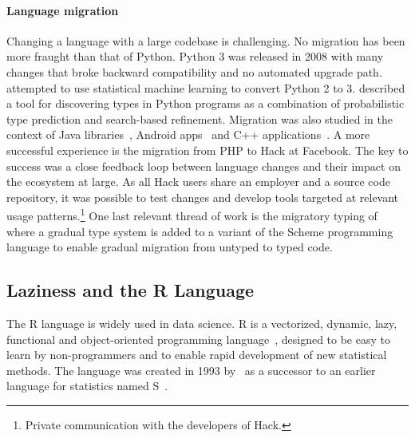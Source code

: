 \documentclass[review,nonacm,screen,acmsmall,anonymous=true]{acmart}
\begin{document}
\paragraph{Language migration} Changing a language with a large codebase
is challenging. No migration has been more fraught than that of Python. Python 3
was released in 2008 with many changes that broke backward compatibility and no
automated upgrade path. \citet{Agg15} attempted to use statistical machine
learning to convert Python 2 to 3. \citet{Pra20} described a tool for
discovering types in Python programs as a combination of probabilistic type
prediction and search-based refinement. Migration was also studied in the
context of Java libraries~\cite{Xu19}, Android apps~\cite{Orso20} and C++
applications~\cite{OB20}. A more successful experience is the migration from PHP
to Hack at Facebook. The key to success was a close feedback loop between
language changes and their impact on the ecosystem at large. As all Hack users
share an employer and a source code repository, it was possible to test changes
and develop tools targeted at relevant usage patterns.\footnote{Private
  communication with the developers of Hack.} One last relevant thread of work
is the migratory typing of \citet{matthias06} where a gradual type system is
added to a variant of the Scheme programming language to enable gradual
migration from untyped to typed code.


\subsection{Laziness and the R Language}

The R language is widely used in data science. R is a vectorized, dynamic, lazy,
functional and object-oriented programming language~\cite{ecoop12}, designed to
be easy to learn by non-programmers and to enable rapid development of new
statistical methods. The language was created in 1993 by~\citet{R96} as a
successor to an earlier language for statistics named S~\cite{S88}.
\end{document}
